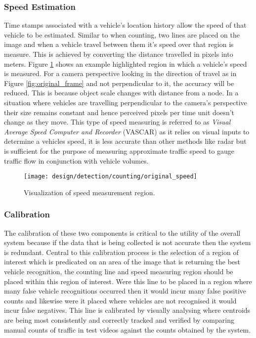 \subsubsection{Speed Estimation}

Time stamps associated with a vehicle's location history allow the speed of that vehicle to be estimated. Similar to when counting, two lines are placed on the image and when a vehicle travel between them it's speed over that region is measure. This is achieved by converting the distance travelled in pixels into meters. Figure \ref{fig:speed} shows an example highlighted region in which a vehicle's speed is measured.  For a camera perspective looking in the direction of travel as in Figure \ref{fig:original_frame} and not perpendicular to it, the accuracy will be reduced. This is because object scale changes with distance from a node. In a situation where vehicles are travelling perpendicular to the camera's perspective their size remains constant and hence perceived pixels per time unit doesn't change as they move. This type of speed measuring is referred to as \emph{Visual Average Speed Computer and Recorder} (VASCAR) as it relies on visual inputs to determine a vehicles speed, it is less accurate than other methods like radar but is sufficient for the purpose of measuring approximate traffic speed to gauge traffic flow in conjunction with vehicle volumes.

\begin{figure}[H]
	\centering
	\centering\texttt{[image: design/detection/counting/original\_speed]}
	\caption{Visualization of speed measurement region.}
	\label{fig:speed}
\end{figure} 

\subsubsection{Calibration}

The calibration of these two components is critical to the utility of the overall system because if the data that is being collected is not accurate then the system is redundant. Central to this calibration process is the selection of a region of interest which is predicated on an area of the image that is returning the best vehicle recognition, the counting line and speed measuring region should be placed within this region of interest. Were this line to be placed in a region where many false vehicle recognitions occurred then it would incur many false positive counts and likewise were it placed where vehicles are not recognised it would incur false negatives. This line is calibrated by visually analysing where centroids are being most consistently and correctly tracked and verified by comparing manual counts of traffic in test videos against the counts obtained by the system. 

